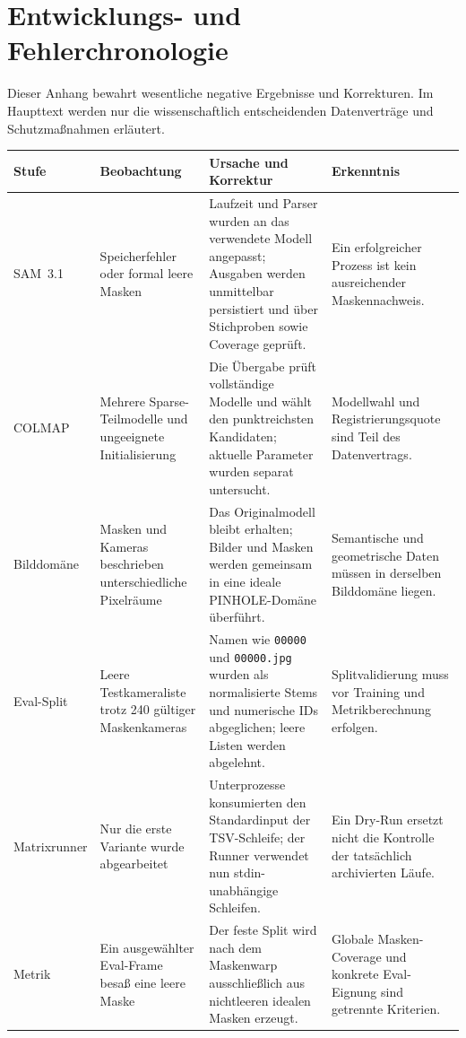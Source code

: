 \clearpage
\section{Entwicklungs- und Fehlerchronologie}

Dieser Anhang bewahrt wesentliche negative Ergebnisse und Korrekturen. Im
Haupttext werden nur die wissenschaftlich entscheidenden Datenverträge und
Schutzmaßnahmen erläutert.

\begin{table}[H]
\centering
\scriptsize
\renewcommand{\arraystretch}{1.05}
\setlength{\tabcolsep}{3pt}
\begin{tabularx}{\textwidth}{p{2.6cm}XXX}
\toprule
Stufe & Beobachtung & Ursache und Korrektur & Erkenntnis\\
\midrule
SAM~3.1 & Speicherfehler oder formal leere Masken & Laufzeit und Parser wurden
an das verwendete Modell angepasst; Ausgaben werden unmittelbar persistiert
und über Stichproben sowie Coverage geprüft. & Ein erfolgreicher Prozess ist
kein ausreichender Maskennachweis.\\
COLMAP & Mehrere Sparse-Teilmodelle und ungeeignete Initialisierung & Die
Übergabe prüft vollständige Modelle und wählt den punktreichsten Kandidaten;
aktuelle Parameter wurden separat untersucht. & Modellwahl und
Registrierungsquote sind Teil des Datenvertrags.\\
Bilddomäne & Masken und Kameras beschrieben unterschiedliche Pixelräume & Das
Originalmodell bleibt erhalten; Bilder und Masken werden gemeinsam in eine
ideale PINHOLE-Domäne überführt. & Semantische und geometrische Daten müssen in
derselben Bilddomäne liegen.\\
Eval-Split & Leere Testkameraliste trotz 240 gültiger Maskenkameras & Namen wie
\texttt{00000} und \texttt{00000.jpg} wurden als normalisierte Stems und
numerische IDs abgeglichen; leere Listen werden abgelehnt. & Splitvalidierung
muss vor Training und Metrikberechnung erfolgen.\\
Matrixrunner & Nur die erste Variante wurde abgearbeitet & Unterprozesse
konsumierten den Standardinput der TSV-Schleife; der Runner verwendet nun
stdin-unabhängige Schleifen. & Ein Dry-Run ersetzt nicht die Kontrolle der
tatsächlich archivierten Läufe.\\
Metrik & Ein ausgewählter Eval-Frame besaß eine leere Maske & Der feste Split
wird nach dem Maskenwarp ausschließlich aus nichtleeren idealen Masken erzeugt.
& Globale Masken-Coverage und konkrete Eval-Eignung sind getrennte Kriterien.\\

\end{tabularx}
\end{table}
